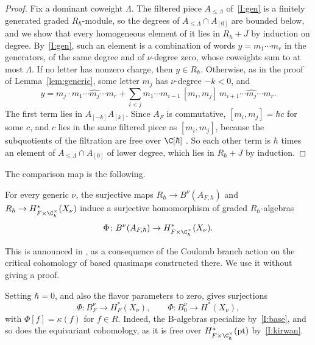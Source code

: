\documentclass[11pt]{amsart}
\begin{document}
\begin{proof}
Fix a dominant coweight $\Lambda$.  The filtered piece $A_{\le\Lambda}$
of~\ref{I:gen} is a finitely generated graded $R_\hbar$-module, so the degrees
of $A_{\le\Lambda}\cap A_{[0]}$ are bounded below, and we show that every
homogeneous element of it lies in $R_\hbar+J$ by induction on degree.
By~\ref{I:gen}, such an element is a combination of words
$y=m_1\cdots m_r$ in the generators, of the same degree and of $\nu$-degree
zero, whose coweights sum to at most $\Lambda$.  If no letter has nonzero
charge, then $y\in R_\hbar$.  Otherwise, as in the proof of
Lemma~\ref{lem:generic}, some letter $m_j$ has $\nu$-degree $-k<0$, and
\[
 y=m_j\cdot m_1\cdots\widehat{m_j}\cdots m_r
 +\sum_{i<j}m_1\cdots m_{i-1}\,[m_i,m_j]\,m_{i+1}\cdots\widehat{m_j}\cdots m_r .
\]
The first term lies in $A_{[-k]}A_{[k]}$.  Since $A_F$ is commutative,
$[m_i,m_j]=\hbar c$ for some $c$, and $c$ lies in the same filtered piece as
$[m_i,m_j]$, because the subquotients of the filtration are free over
$\C[\hbar]$ \cite[\S6(i)]{BFN}.  So each other term is $\hbar$ times an
element of $A_{\le\Lambda}\cap A_{[0]}$ of lower degree, which lies in
$R_\hbar+J$ by induction.
\end{proof}

The comparison map is the following.

\begin{theorem}\label{thm:map}
For every generic $\nu$, the surjective maps $R_{\hbar}\to B^\nu(A_{F,\hbar})$
and $R_{\hbar}\to H^*_{F\times\C^\times_\hbar}(X_\nu)$ induce a surjective
homomorphism of graded $R_\hbar$-algebras
\[
 \Phi\colon B^\nu(A_{F,\hbar})\to H^*_{F\times\C^\times_\hbar}(X_\nu).
\]
\end{theorem}

This is announced in \cite[Thm.~E, \S0.1.6.4]{bottaQuasimapCritical2026}, as a
consequence of the Coulomb branch action on the critical cohomology of based
quasimaps constructed there.  We use it without giving a proof.

Setting $\hbar=0$, and also the flavor parameters to zero, gives
surjections
\[
 \Phi\colon B^\nu_F\to H^*_F(X_\nu),\qquad\Phi\colon B^\nu_0\to H^*(X_\nu),
\]
with $\Phi[f]=\kappa(f)$ for $f\in R$.  Indeed, the B-algebras specialize
by~\ref{I:base}, and so does the equivariant cohomology, as it is free over
$H^*_{F\times\C^\times_\hbar}(\mathrm{pt})$ by~\ref{I:kirwan}.
\end{document}

